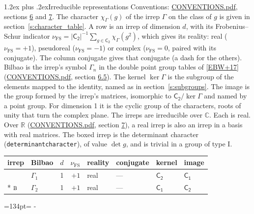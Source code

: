 \documentclass[10pt,a4paper]{article}
\makeatletter
\renewcommand\section{\@startsection{section}{1}{\z@}{-3ex plus -1ex minus -.2ex}%
  {1.2ex plus .2ex}{\normalfont\large\sffamily\bfseries\color{parttitle}}}
\newcommand{\needspace}[1]{\par\penalty-100\begingroup\dimen0=#1\relax\dimen2=\pagegoal
  \advance\dimen2-\pagetotal\ifdim\dimen0>\dimen2\relax\ifdim\dimen2>0pt\vfil\break\fi\fi
  \endgroup}
\numberwithin{equation}{section}
\newcommand{\grp}[1]{\mathsf{#1}}
\newcommand{\irr}[1]{\text{\normalfont\scshape #1}}
\newcommand{\detbox}[1]{{\setlength{\fboxsep}{1pt}\fbox{#1}}}
\newcommand{\irchar}[1]{\chi_{#1}}
\newcommand{\fsind}{\nu_{\mathrm{FS}}}
\makeatother
\begin{document}
\section{Irreducible representations}\label{s:irreps}
Conventions: \href{../../CONVENTIONS.pdf}{CONVENTIONS.pdf}, sections \href{../../CONVENTIONS.pdf\#conv.6}{6} and \href{../../CONVENTIONS.pdf\#conv.7}{7}.
\leavevmode\label{n:function.character}\label{n:irrep.Gamma}The character $\irchar{\Gamma}(g)$ of the irrep $\Gamma$ on the class of $g$ is given in section~\ref{s:character_table}.
\leavevmode\label{n:index.dimension}\label{n:index.frobenius}\label{n:head.irrep}\label{n:head.reality}A row is an irrep of dimension $d$, with its Frobenius--Schur indicator $\fsind = |\grp{C_{2}}|^{-1}\allowbreak\sum_{g\in\grp{C_{2}}}\irchar{\Gamma}(g^2)$, which gives its reality: real ($\fsind = +1$), pseudoreal ($\fsind = -1$) or complex ($\fsind = 0$, paired with its conjugate). \label{n:head.conjugate}The column conjugate gives that conjugate (a dash for the others). \label{n:head.bilbao}\label{n:irrep.alias.gamma}Bilbao is the irrep's symbol $\Gamma_n$ in the double point group tables of [\href{../../../REFERENCES.pdf\#ref.EBW+17}{EBW+17}] (\href{../../CONVENTIONS.pdf}{CONVENTIONS.pdf}, section \href{../../CONVENTIONS.pdf\#conv.6.5}{6.5}). \label{n:head.kernel}The kernel $\ker\Gamma$ is the subgroup of the elements mapped to the identity, named as in section~\ref{s:subgroups}. \label{n:head.image}The image is the group formed by the irrep's matrices, isomorphic to $\grp{C_{2}}/\ker\Gamma$ and named by a point group. For dimension 1 it is the cyclic group of the characters, roots of unity that turn the complex plane. The irreps are irreducible over $\mathbb{C}$. Each is real. Over $\mathbb{R}$ (\href{../../CONVENTIONS.pdf}{CONVENTIONS.pdf}, section \href{../../CONVENTIONS.pdf\#conv.7}{7}), a real irrep is also an irrep in a basis with real matrices. \label{n:mark.determinant}The boxed irrep is the determinant character (\texttt{determinantcharacter}), of value $\det g$, and is trivial in a group of type I.
\setlength{\emergencystretch}{2em}\par\setlength{\emergencystretch}{0pt}
{\small\renewcommand{\arraystretch}{1.25}\begin{longtable}{@{}llrrllll@{}}\toprule
irrep & Bilbao & $d$ & $\fsind$ & reality & conjugate & kernel & image\\\midrule\endhead
\bottomrule\endfoot\endlastfoot
\detbox{$\irr{a}$} & $\Gamma_{1}$ & 1 & $+1$ & real & --- & \href{C2.pdf}{$\grp{C_{2}}$} & \href{C1.pdf}{$\grp{C_{1}}$}\\*
$\irr{b}$ & $\Gamma_{2}$ & 1 & $+1$ & real & --- & \href{C1.pdf}{$\grp{C_{1}}$} & \href{C2.pdf}{$\grp{C_{2}}$}\\
\bottomrule\end{longtable}}
\needspace{134pt}
\end{document}
